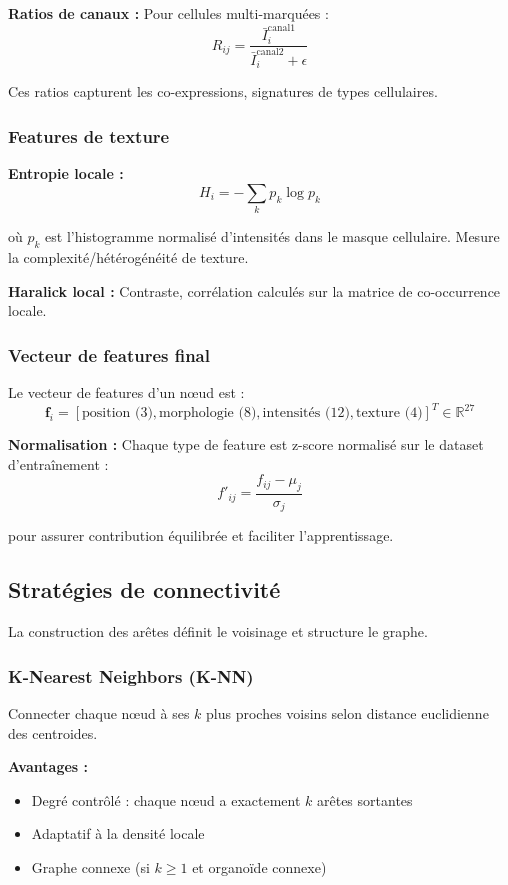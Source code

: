 \textbf{Ratios de canaux :}
Pour cellules multi-marquées :
\[
R_{ij} = \frac{\bar{I}_i^{\text{canal1}}}{\bar{I}_i^{\text{canal2}} + \epsilon}
\]

Ces ratios capturent les co-expressions, signatures de types cellulaires.

\subsubsection{Features de texture}

\textbf{Entropie locale :}
\[
H_i = -\sum_k p_k \log p_k
\]

où $p_k$ est l'histogramme normalisé d'intensités dans le masque cellulaire. Mesure la complexité/hétérogénéité de texture.

\textbf{Haralick local :}
Contraste, corrélation calculés sur la matrice de co-occurrence locale.

\subsubsection{Vecteur de features final}

Le vecteur de features d'un nœud est :
\[
\mathbf{f}_i = [\text{position (3)}, \text{morphologie (8)}, \text{intensités (12)}, \text{texture (4)}]^T \in \mathbb{R}^{27}
\]

\textbf{Normalisation :}
Chaque type de feature est z-score normalisé sur le dataset d'entraînement :
\[
f'_{ij} = \frac{f_{ij} - \mu_j}{\sigma_j}
\]

pour assurer contribution équilibrée et faciliter l'apprentissage.

\subsection{Stratégies de connectivité}

La construction des arêtes définit le voisinage et structure le graphe.

\subsubsection{K-Nearest Neighbors (K-NN)}

Connecter chaque nœud à ses $k$ plus proches voisins selon distance euclidienne des centroides.

\textbf{Avantages :}
\begin{itemize}
    \item Degré contrôlé : chaque nœud a exactement $k$ arêtes sortantes
    \item Adaptatif à la densité locale
    \item Graphe connexe (si $k \geq 1$ et organoïde connexe)
\end{itemize}

